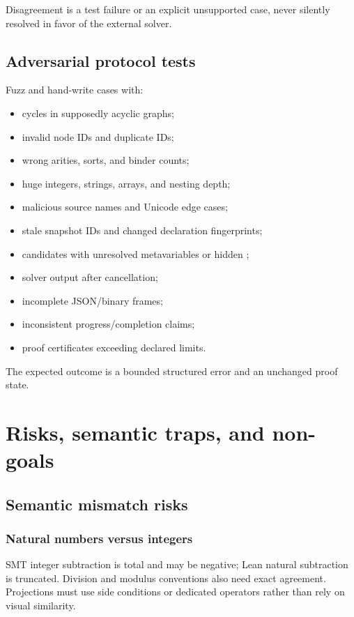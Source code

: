 \documentclass[11pt,letterpaper,openany]{report}
\newcommand{\code}[1]{\texttt{\detokenize{#1}}}
\begin{document}
Disagreement is a test failure or an explicit unsupported case, never silently resolved
in favor of the external solver.

\section{Adversarial protocol tests}

Fuzz and hand-write cases with:

\begin{itemize}
  \item cycles in supposedly acyclic graphs;
  \item invalid node IDs and duplicate IDs;
  \item wrong arities, sorts, and binder counts;
  \item huge integers, strings, arrays, and nesting depth;
  \item malicious source names and Unicode edge cases;
  \item stale snapshot IDs and changed declaration fingerprints;
  \item candidates with unresolved metavariables or hidden \code{sorry};
  \item solver output after cancellation;
  \item incomplete JSON/binary frames;
  \item inconsistent progress/completion claims;
  \item proof certificates exceeding declared limits.
\end{itemize}

The expected outcome is a bounded structured error and an unchanged proof state.

\chapter{Risks, semantic traps, and non-goals}
\label{ch:risks}

\section{Semantic mismatch risks}

\subsection{Natural numbers versus integers}

SMT integer subtraction is total and may be negative; Lean natural subtraction is
truncated. Division and modulus conventions also need exact agreement. Projections
must use side conditions or dedicated operators rather than rely on visual similarity.
\end{document}
